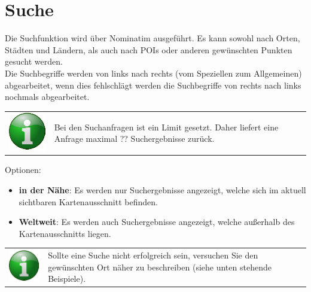 \documentclass[10pt]{scrreprt}
\begin{document}
\vspace{3mm}
\section{Suche} 
Die Suchfunktion wird über Nominatim  ausgeführt. Es kann sowohl nach Orten, Städten und Ländern, als auch nach POIs oder anderen gewünschten Punkten gesucht werden.\\

Die Suchbegriffe werden von links nach rechts (vom Speziellen zum Allgemeinen) abgearbeitet, wenn dies fehlschlägt werden die Suchbegriffe von rechts nach links nochmals abgearbeitet.\\

\vspace{3mm}
\begin{tabular}{>{\centering \arraybackslash}m{1cm} m{14cm}}
\includegraphics[scale=0.5]{images/info.eps} & Bei den Suchanfragen ist ein Limit gesetzt. Daher liefert eine Anfrage maximal ?? Suchergebnisse zurück. \\ 
\end{tabular} 

\vspace{5mm}
Optionen:
\begin{itemize}
\item \textbf{in der Nähe}: Es werden nur Suchergebnisse angezeigt, welche sich im aktuell sichtbaren Kartenausschnitt befinden.
\item \textbf{Weltweit}: Es werden auch Suchergebnisse angezeigt, welche außerhalb des Kartenausschnitts liegen.
\end{itemize}


\vspace{3mm}
\begin{tabular}{>{\centering \arraybackslash}m{1cm} m{14cm}}
\includegraphics[scale=0.5]{images/info.eps} & Sollte eine Suche nicht erfolgreich sein, versuchen Sie den gewünschten Ort näher zu beschreiben (siehe unten stehende Beispiele). \\ 
\end{tabular}
\end{document}
